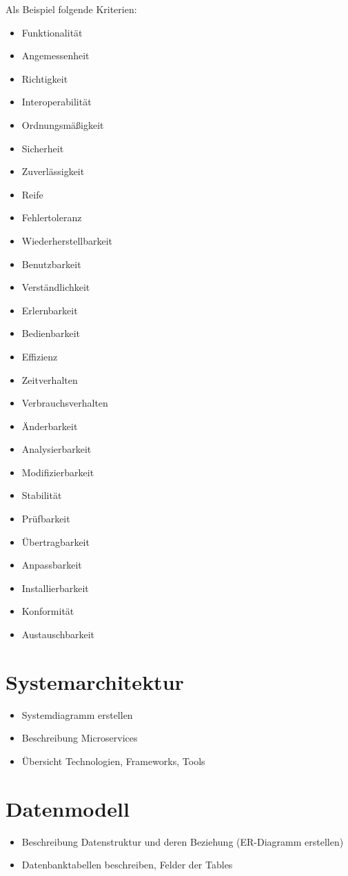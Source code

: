 \documentclass[%
	ngerman,
	12pt,
	a4paper,
	oneside,
	parskip=full
]{scrbook}
\begin{document}
Als Beispiel folgende Kriterien:

\begin{itemize}
	\item Funktionalität
	\item Angemessenheit
	\item Richtigkeit
	\item Interoperabilität
	\item Ordnungsmäßigkeit
	\item Sicherheit
	\item Zuverlässigkeit
	\item Reife
	\item Fehlertoleranz
	\item Wiederherstellbarkeit
	\item Benutzbarkeit
	\item Verständlichkeit
	\item Erlernbarkeit
	\item Bedienbarkeit
	\item Effizienz
	\item Zeitverhalten
	\item Verbrauchsverhalten
	\item Änderbarkeit
	\item Analysierbarkeit
	\item Modifizierbarkeit
	\item Stabilität
	\item Prüfbarkeit
	\item Übertragbarkeit
	\item Anpassbarkeit
	\item Installierbarkeit
	\item Konformität
	\item Austauschbarkeit
\end{itemize}

\chapter{Systemarchitektur}
\begin{itemize}
	\item Systemdiagramm erstellen
	\item Beschreibung Microservices
	\item Übersicht Technologien, Frameworks, Tools
\end{itemize}

\chapter{Datenmodell}
\begin{itemize}
	\item Beschreibung Datenstruktur und deren Beziehung (ER-Diagramm erstellen)
	\item Datenbanktabellen beschreiben, Felder der Tables
\end{itemize}
\end{document}
